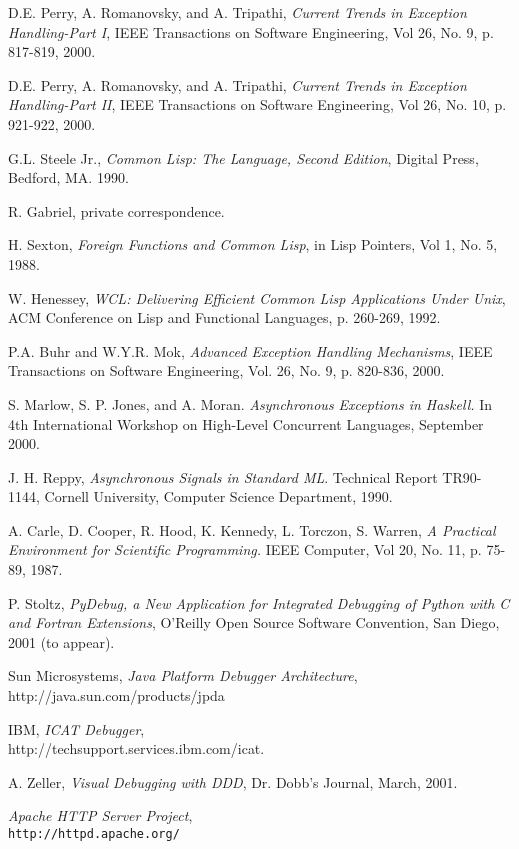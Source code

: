 \begin{thebibliography}{99}
 D.E. Perry, A. Romanovsky, and A. Tripathi, {\em
Current Trends in Exception Handling-Part I},
IEEE Transactions on Software Engineering, Vol 26, No. 9, p. 817-819, 2000.

 D.E. Perry, A. Romanovsky, and A. Tripathi, {\em
Current Trends in Exception Handling-Part II},
IEEE Transactions on Software Engineering, Vol 26, No. 10, p. 921-922, 2000.


 G.L. Steele Jr., {\em Common Lisp: The Language, Second Edition}, Digital Press,
Bedford, MA. 1990.

 R. Gabriel, private correspondence.

 H. Sexton, {\em Foreign Functions and Common Lisp}, in Lisp Pointers, Vol 1, No. 5, 1988.

 W. Henessey, {\em WCL: Delivering Efficient Common Lisp Applications Under Unix},
ACM Conference on Lisp and Functional Languages, p. 260-269, 1992.

 P.A. Buhr and W.Y.R. Mok, {\em Advanced Exception Handling Mechanisms}, IEEE Transactions on Software Engineering,
Vol. 26, No. 9, p. 820-836, 2000. 

 S. Marlow, S. P. Jones, and A. Moran. {\em
Asynchronous Exceptions in Haskell.} In 4th International Workshop on
High-Level Concurrent Languages, September 2000.

 J. H. Reppy, {\em Asynchronous Signals in Standard ML}. Technical Report TR90-1144,
Cornell University, Computer Science Department, 1990.

 A. Carle, D. Cooper, R. Hood, K. Kennedy, L. Torczon, S. Warren, 
{\em A Practical Environment for Scientific Programming.}
IEEE Computer, Vol 20, No. 11, p. 75-89, 1987.

 P. Stoltz, {\em PyDebug, a New Application for Integrated
Debugging of Python with C and Fortran Extensions}, O'Reilly Open Source Software Convention,
San Diego, 2001 (to appear).

 Sun Microsystems, {\em Java Platform Debugger Architecture}, 
http://java.sun.com/products/jpda

 IBM, {\em ICAT Debugger}, \\
http://techsupport.services.ibm.com/icat.

 A. Zeller, {\em Visual Debugging with DDD}, Dr. Dobb's Journal, March, 2001.

 {\em Apache HTTP Server Project}, \\
{\tt http://httpd.apache.org/}

\end{thebibliography}










